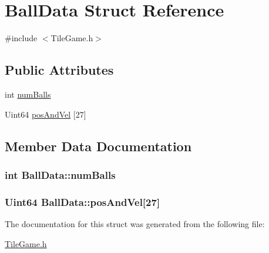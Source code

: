 \hypertarget{structBallData}{\section{Ball\-Data Struct Reference}
\label{structBallData}
}


{\ttfamily \#include $<$Tile\-Game.\-h$>$}

\subsection*{Public Attributes}
\begin{DoxyCompactItemize}
\item 
int \hyperlink{structBallData_adbec846205500562d917df9695a85134}{num\-Balls}
\item 
Uint64 \hyperlink{structBallData_a00d4d583f0b63b6a4e2997d178555d87}{pos\-And\-Vel} \mbox{[}27\mbox{]}
\end{DoxyCompactItemize}


\subsection{Member Data Documentation}
\hypertarget{structBallData_adbec846205500562d917df9695a85134}{
\subsubsection[{num\-Balls}]{\setlength{\rightskip}{0pt plus 5cm}int Ball\-Data\-::num\-Balls}}\label{structBallData_adbec846205500562d917df9695a85134}
\hypertarget{structBallData_a00d4d583f0b63b6a4e2997d178555d87}{
\subsubsection[{pos\-And\-Vel}]{\setlength{\rightskip}{0pt plus 5cm}Uint64 Ball\-Data\-::pos\-And\-Vel\mbox{[}27\mbox{]}}}\label{structBallData_a00d4d583f0b63b6a4e2997d178555d87}


The documentation for this struct was generated from the following file\-:\begin{DoxyCompactItemize}
\item 
\hyperlink{TileGame_8h}{Tile\-Game.\-h}\end{DoxyCompactItemize}
